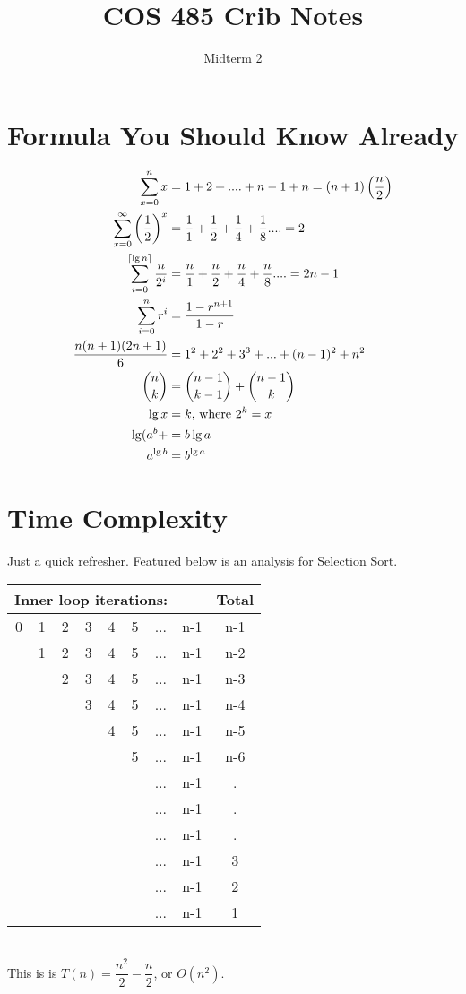 \documentclass[aip, jmp, amsmath,amssymb, reprint]{revtex4-1}
\DeclarePairedDelimiter\ceil{\lceil}{\rceil}
\theoremstyle{definition}
\begin{document}
\title{COS 485 Crib Notes}
\author{Midterm 2}
\maketitle
\section{Formula You Should Know Already}
\begin{align*}
    \sum\limits_{x = 0}^{n} x &= 1 + 2 +....+n-1 + n = (n+1)\left(\frac{n}{2}\right)\\
    \sum\limits_{x = 0}^{\infty} \left(\frac{1}{2}\right)^x &= \frac{1}{1} + \frac{1}{2} + \frac{1}{4} + \frac{1}{8}.... = 2\\
    \sum\limits_{i = 0}^{\ceil{\lg n}} \frac{n}{2^i} &= \frac{n}{1} + \frac{n}{2} + \frac{n}{4} + \frac{n}{8}.... = 2n-1\\
    \sum\limits_{i = 0}^{n} r^i &= \frac{1-r^{n+1}}{1-r}\\
    \frac{n(n+1)(2n+1)}{6} &= 1^2 + 2^2 + 3^3 +...+ (n-1)^2 + n^2\\
    \binom{n}{k} &= \binom{n - 1}{k - 1} + \binom{n - 1}{k}\\
    \lg x &= k\text{, where } 2^k = x\\
    \lg(a^b+ &= b \lg a\\
    a^{\lg b} &= b^{\lg a}
\end{align*}

\section{Time Complexity}
Just a quick refresher. Featured below is an analysis for Selection Sort.\\
\begin{tabular}{c c c c c c c c | c}
\multicolumn{7}{l}{Inner loop iterations:} & & Total\\
\hline
0 & 1 & 2 & 3 & 4 & 5 &...& n-1 & n-1\\
    & 1 & 2 & 3 & 4 & 5 &... & n-1 & n-2\\
    &   & 2 & 3 & 4 & 5 &... & n-1 & n-3\\
    &   &   & 3 & 4 & 5 &... & n-1 & n-4\\
    &   &   &   & 4 & 5 &... & n-1 & n-5\\
    &   &   &   &   & 5 &... & n-1 & n-6\\
    &   &   &   &   &   &... & n-1 & .\\
    &   &   &   &   &   &... & n-1 & .\\
    &   &   &   &   &   &... & n-1 & .\\
    &   &   &   &   &   &... & n-1 & 3\\
    &   &   &   &   &   &... & n-1 & 2\\
    &   &   &   &   &   &... & n-1 & 1\\
\end{tabular}\\
This is is $T(n) = \dfrac{n^2}{2} - \dfrac{n}{2}$, or $O(n^2)$.\\
\end{document}
